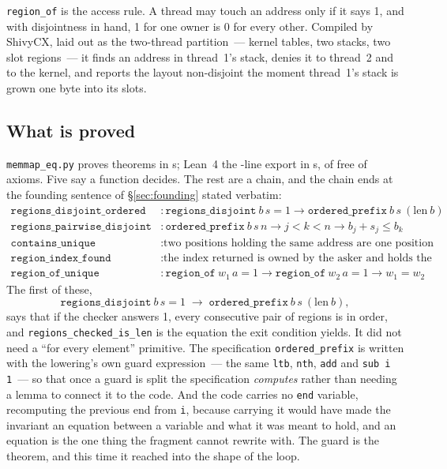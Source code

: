 \documentclass[11pt]{article}
\begin{document}


\texttt{region\_of} is the access rule.  A thread may touch an address only
if it says 1, and with disjointness in hand, 1 for one owner is 0 for every
other.  Compiled by ShivyCX, laid out as the two-thread partition~--- kernel
tables, two stacks, two slot regions~--- it finds an address in thread~1's
stack, denies it to thread~2 and to the kernel, and reports the layout
non-disjoint the moment thread~1's stack is grown one byte into its slots.

\subsection{What is proved}

\texttt{memmap\_eq.py} proves \memTheorems{} theorems in
\memBuildSeconds{}s; Lean~4 \memLeanVerdict{} the \memLeanLines{}-line
export in \memLeanSeconds{}s, \memLeanNoAxioms{} of \memTheorems{} free of
axioms.  Five say a function decides.  The rest are a chain, and the chain
ends at the founding sentence of \S\ref{sec:founding} stated verbatim:
\begin{align*}
\texttt{regions\_disjoint\_ordered} &: \texttt{regions\_disjoint}\ b\,s = 1 \to \texttt{ordered\_prefix}\ b\,s\ (\mathrm{len}\ b)\\
\texttt{regions\_pairwise\_disjoint} &: \texttt{ordered\_prefix}\ b\,s\,n \to j<k<n \to b_j+s_j \le b_k\\
\texttt{contains\_unique} &: \text{two positions holding the same address are one position}\\
\texttt{region\_index\_found} &: \text{the index returned is owned by the asker and holds the address}\\
\texttt{region\_of\_unique} &: \texttt{region\_of}\ w_1\,a = 1 \to \texttt{region\_of}\ w_2\,a = 1 \to w_1 = w_2
\end{align*}
The first of these,
\[
\texttt{regions\_disjoint}\ b\,s = 1 \;\to\; \texttt{ordered\_prefix}\ b\,s\ (\mathrm{len}\ b),
\]
says that if the checker answers 1, every consecutive pair of regions is
in order, and \texttt{regions\_checked\_is\_len} is the equation the exit
condition yields.  It did not need a ``for every element'' primitive.  The
specification \texttt{ordered\_prefix} is written with the lowering's own
guard expression~--- the same \texttt{ltb}, \texttt{nth}, \texttt{add} and
\texttt{sub i 1}~--- so that once a guard is split the specification
\emph{computes} rather than needing a lemma to connect it to the code.  And
the code carries no \texttt{end} variable, recomputing the previous end from
\texttt{i}, because carrying it would have made the invariant an equation
between a variable and what it was meant to hold, and an equation is the one
thing the fragment cannot rewrite with.  The guard is the theorem, and this
time it reached into the shape of the loop.
\end{document}
